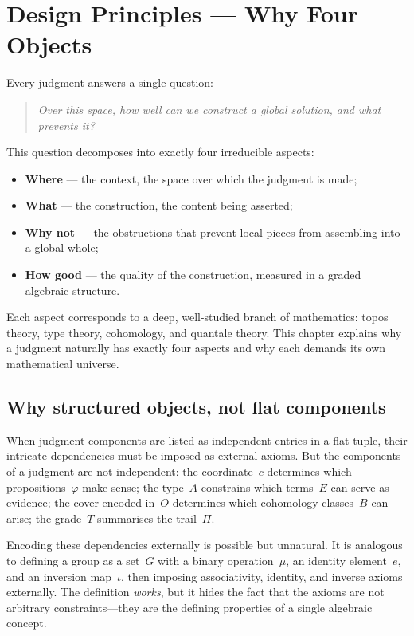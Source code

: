 
\chapter{Design Principles --- Why Four Objects}
\label{ch:motivation}

Every judgment answers a single question:
\begin{quote}
  \emph{Over this space, how well can we construct a global solution,
  and what prevents it?}
\end{quote}
This question decomposes into exactly four irreducible aspects:
\begin{itemize}[nosep]
\item \textbf{Where} --- the context, the space over which the
  judgment is made;
\item \textbf{What} --- the construction, the content being asserted;
\item \textbf{Why not} --- the obstructions that prevent local pieces
  from assembling into a global whole;
\item \textbf{How good} --- the quality of the construction, measured
  in a graded algebraic structure.
\end{itemize}
Each aspect corresponds to a deep, well-studied branch of mathematics:
topos theory, type theory, cohomology, and quantale theory.  This
chapter explains why a judgment naturally has exactly four aspects
and why each demands its own mathematical universe.

\section{Why structured objects, not flat components}

When judgment components are listed as independent entries in a flat
tuple, their intricate dependencies must be imposed as external
axioms.  But the components of a judgment are not independent: the
coordinate~$c$ determines which
propositions~$\varphi$ make sense; the type~$A$ constrains which
terms~$E$ can serve as evidence; the cover encoded in~$O$ determines
which cohomology classes~$B$ can arise; the grade~$T$ summarises the
trail~$\Pi$.

Encoding these dependencies externally is
possible but unnatural.  It is analogous to defining a group as a
set~$G$ with a binary operation~$\mu$, an identity element~$e$, and an
inversion map~$\iota$, then imposing associativity, identity, and
inverse axioms externally.  The definition \emph{works}, but it hides
the fact that the axioms are not arbitrary constraints---they are the
defining properties of a single algebraic concept.


